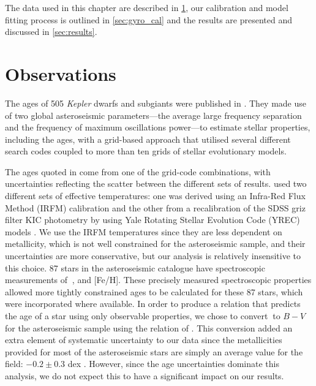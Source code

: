 The data used in this chapter are described in \textsection \ref{sec:data},
our calibration and model fitting process is outlined in \textsection
\ref{sec:gyro_cal} and the results are presented and discussed in \textsection
\ref{sec:results}.

\section{Observations}
\label{sec:data}

The ages of 505 {\it Kepler} dwarfs and subgiants were published in
\citet{Chaplin2014}.
They made use of two global asteroseismic parameters---the average large
frequency separation and the frequency of maximum oscillations power---to
estimate stellar properties, including the ages, with a grid-based approach
that utilised several different search codes coupled to more than ten grids of
stellar evolutionary models.

The ages quoted in \citet{Chaplin2014} come from one of the grid-code
combinations, with uncertainties reflecting the scatter between the different
sets of results.
\citet{Chaplin2014} used two different sets of effective temperatures: one was
derived using an Infra-Red Flux Method (IRFM) calibration
\citep{Casagrande2010, SilvaAguirre2012} and the other from a recalibration of
the SDSS griz filter KIC photometry by \citet{Pinsonneault2012} using Yale
Rotating Stellar Evolution Code (YREC) models \citep{Demarque2004}.
We use the IRFM temperatures since they are less dependent on metallicity,
which is not well constrained for the asteroseismic sample, and their
uncertainties are more conservative, but our analysis is relatively
insensitive to this choice.
87 stars in the asteroseismic catalogue have spectroscopic measurements of
\teff$~$, and [Fe/H].
These precisely measured spectroscopic properties allowed more tightly
constrained ages to be calculated for these 87 stars, which were
incorporated where available.
In order to produce a relation that predicts the age of a star using only
observable properties, we chose to convert \teff$~$to $B-V$ for the
asteroseismic sample using the relation of \citet{Sekiguchi2000}.
This conversion added an extra element of systematic uncertainty to our data
since the metallicities provided for most of the asteroseismic stars are
simply an average value for the field: $-0.2\pm0.3$ dex \citep[see e.g.][]{Silva_Aguirre2011}.  %
However, since the age uncertainties dominate this analysis, we do not expect
this to have a significant impact on our results.

